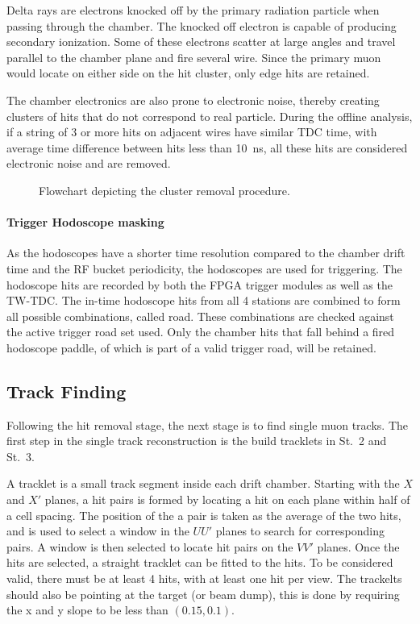 \documentclass[../main.tex]{subfiles}
\begin{document}
Delta rays are electrons knocked off by the primary radiation particle when passing
through the chamber. The knocked off electron is capable of producing secondary ionization.
Some of these electrons scatter at large angles and travel parallel to the chamber plane
and fire several wire. Since the primary muon would locate on either side on the hit cluster,
only edge hits are retained.

The chamber electronics are also prone to electronic noise, thereby creating clusters of
hits that do not correspond to real particle. During the offline analysis, if a string of
3 or more hits on adjacent wires have similar TDC time, with average time difference between
hits less than \SI{10}{\ns}, all these hits are considered electronic noise and are removed.

\begin{figure}
	\centering
	
	\caption{Flowchart depicting the cluster removal procedure.}
\end{figure}

\paragraph{Trigger Hodoscope masking}
As the hodoscopes have a shorter time resolution compared to the chamber drift time and
the RF bucket periodicity, the hodoscopes are used for triggering. The hodoscope hits
are recorded by both the FPGA trigger modules as well as the TW-TDC. The in-time hodoscope
hits from all 4 stations are combined to form all possible combinations, called road. These
combinations are checked against the active trigger road set used. Only the chamber hits
that fall behind a fired hodoscope paddle, of which is part of a valid trigger road, will be retained.


\subsection{Track Finding}
Following the hit removal stage, the next stage is to find single muon tracks.
The first step in the single track reconstruction is the build tracklets in St.~2 and St.~3.

A tracklet is a small track segment inside each drift chamber. Starting with the $X$ and
$X'$ planes, a hit pairs is formed by locating a hit on each plane within half of a cell spacing.
The position of the a pair is taken as the average of the two hits, and is used to select a window
in the $UU'$ planes to search for corresponding pairs. A window is then selected to locate hit pairs
on the $VV'$ planes. Once the hits are selected, a straight tracklet can be fitted to the hits.
To be considered valid, there must be at least 4 hits, with at least one hit per view. The trackelts
should also be pointing at the target (or beam dump), this is done by requiring the x and y slope to be
less than $(0.15,0.1)$.
\end{document}
